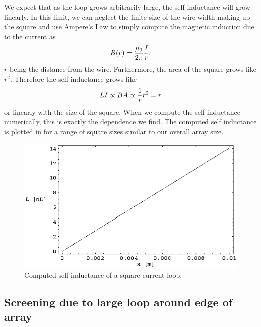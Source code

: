 We expect
that as the loop grows arbitrarily large, the self inductance will
grow linearly. In this limit, we can neglect the finite size of the
wire width making up the square and use Ampere's Law to simply 
compute the magnetic induction due to the current as
%
\begin{equation}
B(r) = {\mu_0 \over 2 \pi} {I \over r},
\end{equation}
$r$ being the distance from the wire. Furthermore, the area
of the square grows like $r^2$. Therefore the self-inductance
grows like
%
\begin{equation}
L I \propto B A \propto {1 \over r} r^2 = r
\end{equation}
%
or linearly with the size of the square. When we compute the self
inductance numerically, this is exactly the dependence we find.
The computed self inductance is 
plotted in  for a range of square sizes
similar to our overall array size.

%
%
\begin{figure}[p]
\includegraphics[width=5.7in]{figs/pme_theory/squareselfinductance.ps}
\caption[Computed self inductance of a square current loop.]
{Computed self inductance of a square current loop.}
\label{fig:self_ind_plot}
\end{figure}



\subsection{Screening due to large loop around edge of array}

